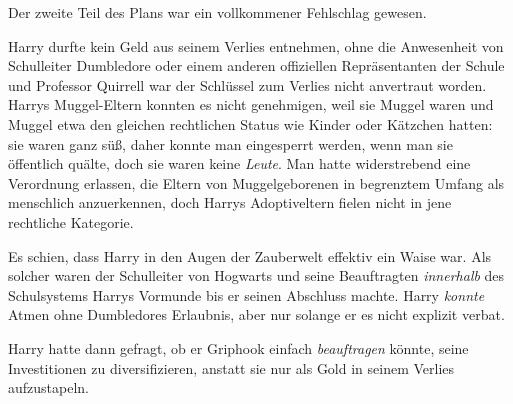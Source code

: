 Der zweite Teil des Plans war ein vollkommener Fehlschlag gewesen.

Harry durfte kein Geld aus seinem Verlies entnehmen, ohne die Anwesenheit von Schulleiter Dumbledore oder einem anderen offiziellen Repräsentanten der Schule und Professor Quirrell war der Schlüssel zum Verlies nicht anvertraut worden. Harrys Muggel-Eltern konnten es nicht genehmigen, weil sie Muggel waren und Muggel etwa den gleichen rechtlichen Status wie Kinder oder Kätzchen hatten: sie waren ganz süß, daher konnte man eingesperrt werden, wenn man sie öffentlich quälte, doch sie waren keine \emph{Leute}. Man hatte widerstrebend eine Verordnung erlassen, die Eltern von Muggelgeborenen in begrenztem Umfang als menschlich anzuerkennen, doch Harrys Adoptiveltern fielen nicht in jene rechtliche Kategorie.

Es schien, dass Harry in den Augen der Zauberwelt effektiv ein Waise war. Als solcher waren der Schulleiter von Hogwarts und seine Beauftragten \emph{innerhalb} des Schulsystems Harrys Vormunde bis er seinen Abschluss machte. Harry \emph{konnte} Atmen ohne Dumbledores Erlaubnis, aber nur solange er es nicht explizit verbat.

Harry hatte dann gefragt, ob er Griphook einfach \emph{beauftragen} könnte, seine Investitionen zu diversifizieren, anstatt sie nur als Gold in seinem Verlies aufzustapeln.

